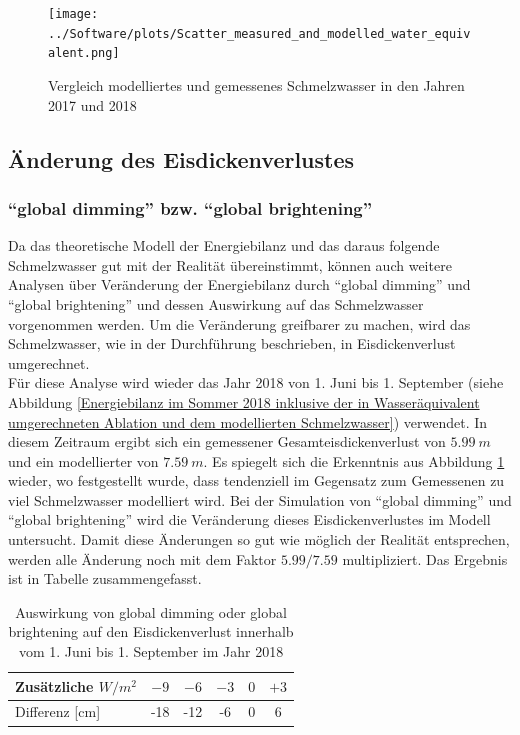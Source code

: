 \documentclass[12pt,a4paper]{article}
\begin{document}
\begin{figure}[H]
\centering
\texttt{[image: ../Software/plots/Scatter\_measured\_and\_modelled\_water\_equivalent.png]}
\caption{Vergleich modelliertes und gemessenes Schmelzwasser in den Jahren 2017 und 2018}
\label{Vergleich modelliertes und gemessenes Schmelzwasser}
\end{figure}



\subsection{Änderung des Eisdickenverlustes}
\subsubsection{``global dimming'' bzw. ``global brightening''}
Da das theoretische Modell der Energiebilanz und das daraus folgende Schmelzwasser gut mit der Realität übereinstimmt, können auch weitere Analysen über Veränderung der Energiebilanz durch ``global dimming'' und ``global brightening'' und dessen Auswirkung auf das Schmelzwasser vorgenommen werden. Um die Veränderung greifbarer zu machen, wird das Schmelzwasser, wie in der Durchführung beschrieben, in Eisdickenverlust umgerechnet.\\

Für diese Analyse wird wieder das Jahr 2018 von 1. Juni bis 1. September (siehe Abbildung \ref{Energiebilanz im Sommer 2018 inklusive der in Wasseräquivalent umgerechneten Ablation und dem modellierten Schmelzwasser}) verwendet. In diesem Zeitraum ergibt sich ein gemessener Gesamteisdickenverlust von $5.99~m$ und ein modellierter von $7.59~m$. Es spiegelt sich die Erkenntnis aus Abbildung \ref{Vergleich modelliertes und gemessenes Schmelzwasser} wieder, wo festgestellt wurde, dass tendenziell im Gegensatz zum Gemessenen zu viel Schmelzwasser modelliert wird. Bei der Simulation von ``global dimming'' und ``global brightening'' wird die Veränderung dieses Eisdickenverlustes im Modell untersucht. Damit diese Änderungen so gut wie möglich der Realität entsprechen, werden alle Änderung noch mit dem Faktor $5.99/7.59$ multipliziert. Das Ergebnis ist in Tabelle zusammengefasst.

\begin{table}[H]
\centering
{} 
\caption{Auswirkung von global dimming oder global brightening auf den Eisdickenverlust innerhalb vom 1. Juni bis 1. September im Jahr 2018}
\label{tab:Auswirkung von global dimming oder global brightening auf den Eisdickenverlust innerhalb vom 1. Juni bis 1. September im Jahr 2018}
\begin{tabular}{|l|c|c|c|c|c|}
\hline
Zusätzliche $W/m^2$       &  $-9$ & $-6$  & $-3$ & $0$ & $+3$ \\ \hline
Differenz {[}cm{]} & -18    & -12 & -6 & 0  & 6  \\ \hline
\end{tabular}
\end{table}
\end{document}
